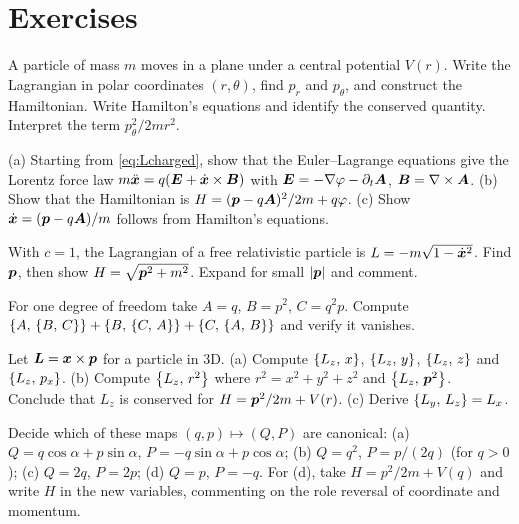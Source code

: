 \documentclass[11pt]{article}
\begin{document}
\section{Exercises}

\begin{exercise}\label{ex:central}
A particle of mass $m$ moves in a plane under a central potential $V(r)$. Write the Lagrangian in polar coordinates $(r,\theta)$, find $p_r$ and $p_\theta$, and construct the Hamiltonian. Write Hamilton's equations and identify the conserved quantity. Interpret the term $p_\theta^2/2mr^2$.
\end{exercise}

\begin{exercise}\label{ex:charged}
(a) Starting from \eqref{eq:Lcharged}, show that the Euler--Lagrange equations give the Lorentz force law $m\ddot{\bm{x}}=q(\bm{E}+\dot{\bm{x}}\times\bm{B})$ with $\bm{E}=-\nabla\varphi-\partial_t\bm{A}$, $\bm{B}=\nabla\times\bm{A}$. (b) Show that the Hamiltonian is $H=(\bm{p}-q\bm{A})^2/2m+q\varphi$. (c) Show $\dot{\bm{x}}=(\bm{p}-q\bm{A})/m$ follows from Hamilton's equations.
\end{exercise}

\begin{exercise}\label{ex:relativistic}
With $c=1$, the Lagrangian of a free relativistic particle is $L=-m\sqrt{1-\dot{\bm{x}}^2}$. Find $\bm{p}$, then show $H=\sqrt{\bm{p}^2+m^2}$. Expand for small $|\bm{p}|$ and comment.
\end{exercise}

\begin{exercise}\label{ex:jacobi}
For one degree of freedom take $A=q$, $B=p^2$, $C=q^2p$. Compute $\left\{A,\,\left\{B,\,C\right\}\right\}+\left\{B,\,\left\{C,\,A\right\}\right\}+\left\{C,\,\left\{A,\,B\right\}\right\}$ and verify it vanishes.
\end{exercise}

\begin{exercise}\label{ex:Lbrackets}
Let $\bm{L}=\bm{x}\times\bm{p}$ for a particle in 3D. (a) Compute $\left\{L_z,\,x\right\}$, $\left\{L_z,\,y\right\}$, $\left\{L_z,\,z\right\}$ and $\left\{L_z,\,p_x\right\}$. (b) Compute $\left\{L_z,\,r^2\right\}$ where $r^2=x^2+y^2+z^2$ and $\left\{L_z,\,\bm{p}^2\right\}$. Conclude that $L_z$ is conserved for $H=\bm{p}^2/2m+V(r)$. (c) Derive $\left\{L_y,\,L_z\right\}=L_x$.
\end{exercise}

\begin{exercise}\label{ex:canonical}
Decide which of these maps $(q,p)\mapsto(Q,P)$ are canonical: (a) $Q=q\cos\alpha+p\sin\alpha$, $P=-q\sin\alpha+p\cos\alpha$; (b) $Q=q^2$, $P=p/(2q)$ (for $q>0$); (c) $Q=2q$, $P=2p$; (d) $Q=p$, $P=-q$. For (d), take $H=p^2/2m+V(q)$ and write $H$ in the new variables, commenting on the role reversal of coordinate and momentum.
\end{exercise}
\end{document}
